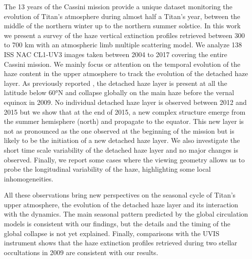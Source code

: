 The 13 years of the Cassini mission provide a unique dataset monitoring
the evolution of Titan’s atmosphere during almost half a Titan's year,
between the middle of the northern winter up to the northern summer solstice.
In this work we present a survey of the haze vertical extinction profiles retrieved
between 300 to 700 km with an atmospheric limb multiple scattering model.
We analyze 138 ISS NAC CL1-UV3 images taken between 2004 to 2017 covering the
entire Cassini mission.
We mainly focus or attention on the temporal evolution of the haze content
in the upper atmosphere to track the evolution of the detached haze layer.
As previously reported \citep{West2011}, the detached haze layer is present
at all the latitude below \ang{60}N and collapse globally on the main haze
before the vernal equinox in 2009.
No individual detached haze layer is observed between 2012 and 2015 but
we show that at the end of 2015, a new complex structure emerge from
the summer hemisphere (north) and propagate to the equator. This new layer
is not as pronounced as the one observed at the beginning of the mission but
is likely to be the initiation of a new detached haze layer.
We also investigate the short time scale variability of the detached haze
layer and no major changes is observed. Finally, we report some cases
where the viewing geometry allows us to probe the longitudinal variability
of the haze, highlighting some local inhomogeneities.

All these observations bring new perspectives
on the seasonal cycle of Titan's upper atmosphere, the evolution of the detached
haze layer and its interaction with the dynamics.
The main seasonal pattern predicted by the global circulation models is consistent
with our findings, but the details and the timing of the global collapse
is not yet explained. Finally, comparisons with the UVIS instrument shows
that the haze extinction profiles retrieved during two stellar occultations
in 2009 are consistent with our results.